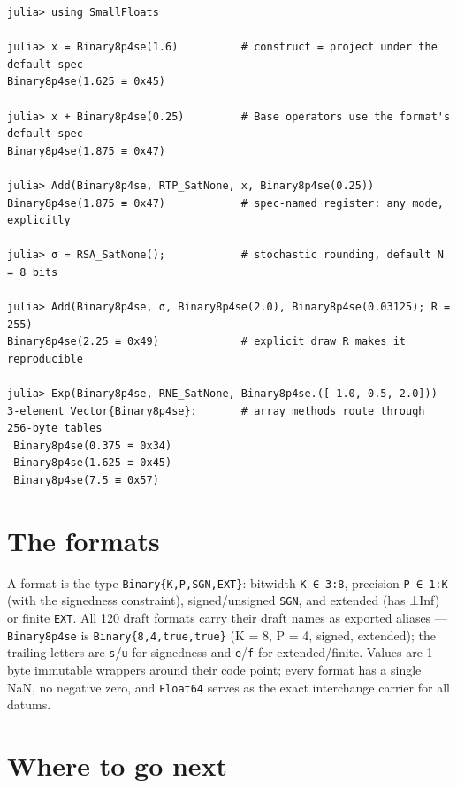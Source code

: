 \label{18023860074456033423}{}



\begin{verbatim}
julia> using SmallFloats

julia> x = Binary8p4se(1.6)          # construct = project under the default spec
Binary8p4se(1.625 ≡ 0x45)

julia> x + Binary8p4se(0.25)         # Base operators use the format's default spec
Binary8p4se(1.875 ≡ 0x47)

julia> Add(Binary8p4se, RTP_SatNone, x, Binary8p4se(0.25))
Binary8p4se(1.875 ≡ 0x47)            # spec-named register: any mode, explicitly

julia> σ = RSA_SatNone();            # stochastic rounding, default N = 8 bits

julia> Add(Binary8p4se, σ, Binary8p4se(2.0), Binary8p4se(0.03125); R = 255)
Binary8p4se(2.25 ≡ 0x49)             # explicit draw R makes it reproducible

julia> Exp(Binary8p4se, RNE_SatNone, Binary8p4se.([-1.0, 0.5, 2.0]))
3-element Vector{Binary8p4se}:       # array methods route through 256-byte tables
 Binary8p4se(0.375 ≡ 0x34)
 Binary8p4se(1.625 ≡ 0x45)
 Binary8p4se(7.5 ≡ 0x57)
\end{verbatim}



\section{The formats}



\label{13054678588546481008}{}


A format is the type \texttt{Binary\{K,P,SGN,EXT\}}: bitwidth \texttt{K ∈ 3:8}, precision \texttt{P ∈ 1:K} (with the signedness constraint), signed/unsigned \texttt{SGN}, and extended (has ±Inf) or finite \texttt{EXT}. All 120 draft formats carry their draft names as exported aliases — \texttt{Binary8p4se} is \texttt{Binary\{8,4,true,true\}} ({\textquotedbl}K = 8, P = 4, signed, extended{\textquotedbl}); the trailing letters are \texttt{s}/\texttt{u} for signedness and \texttt{e}/\texttt{f} for extended/finite. Values are 1-byte immutable wrappers around their code point; every format has a single NaN, no negative zero, and \texttt{Float64} serves as the exact interchange carrier for all datums.



\section{Where to go next}



